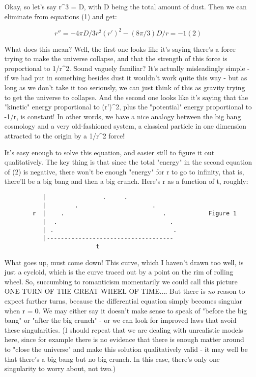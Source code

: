 Okay, so let's say \rho  r^{3} = D, with D being the total amount of dust.  
Then we can eliminate \rho  from equations (1) and get:

$$
r'' = -4\pi D/3r^{2}          (r')^{2} - (8\pi /3) D/r = - 1                (2)
$$
    

What does this mean?   Well, the first one looks like it's saying
there's a force trying to make the universe collapse, and that the
strength of this force is proportional to 1/r^{2}.  Sound vaguely
familiar?  It's actually misleadingly simple - if we had put in
something besides dust it wouldn't work quite this way - but as long as we
don't take it too seriously, we can just think of this as gravity trying
to get the universe to collapse.  And the second one looks like it's
saying that the "kinetic" energy proportional to (r')^{2}, plus the
"potential" energy proportional to -1/r, is constant!  In other words,
we have a nice analogy between the big bang cosmology and a very
old-fashioned system, a classical particle in one dimension attracted to
the origin by a 1/r^{2} force!   

It's easy enough to solve this equation, and easier still to figure it out
qualitatively.  The key thing is that since the total "energy" in
the second equation of (2) is negative, there won't be enough "energy"
for r to go to infinity, that is, there'll be a big bang and then a big
crunch.  Here's r as a function of t, roughly:


\begin{verbatim}
           |                .     .
           |        .                     .
        r  |    .                            .            Figure 1
           |  .                                .
           | .                                  .
           |------------------------------------
                          t
\end{verbatim}
    

What goes up, must come down!  This curve, which I haven't drawn too
well, is just a cycloid, which is the curve traced out by a point on the
rim of rolling wheel.  So, succumbing to romanticism momentarily we
could call this picture ONE TURN OF THE GREAT WHEEL OF TIME....  But
there is \emph{no} reason to expect further turns, because the
differential equation simply becomes singular when r = 0.  We may either
say it doesn't make sense to speak of "before the big bang" or "after
the big crunch" - or we can look for improved laws that avoid these
singularities.  (I should repeat that we are dealing with unrealistic models
here, since for example there is no evidence that there is enough matter
around to "close the universe" and make this solution qualitatively
valid - it may well be that there's a big bang but no big crunch.  In
this case, there's only one singularity to worry about, not two.)  

